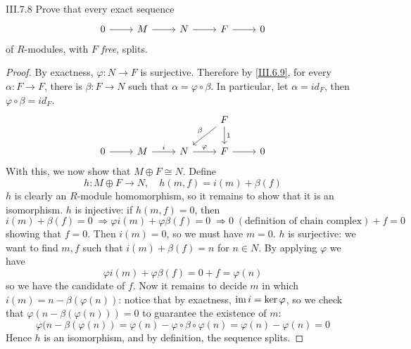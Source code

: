 \begin{problem}{III.7.8}
Prove that every exact sequence
\[
\begin{tikzcd}
0 \arrow[r] &M \arrow[r] &N \arrow[r] &F \arrow[r] &0
\end{tikzcd}
\]
of $R$-modules, with $F$ \emph{free}, splits.
\end{problem}
\begin{proof}
By exactness, $\varphi :N \longrightarrow F$ is surjective. Therefore by \ref{III.6.9}, for every $\alpha : F \to F$, there is $\beta : F \to N$ such that $\alpha = \varphi \circ \beta$. In particular, let $\alpha = id_F$, then $\varphi \circ \beta = id_F$.
\[
\begin{tikzcd}
&  &  & F \arrow[d, "1"] \arrow[ld, "\beta"'] &   \\
0 \arrow[r] & M \arrow[r, "i"] & N \arrow[r, "\varphi"] & F \arrow[r]                           & 0
\end{tikzcd}
\]
With this, we now show that $M \oplus F \cong N$. Define
\[
h: M \oplus F \to N, \quad	h(m,f) = i(m) + \beta(f)
\]
$h$ is clearly an $R$-module homomorphism, so it remains to show that it is an isomorphism. $h$ is injective: if $h(m,f) = 0$, then
\[
i(m) + \beta(f) = 0 \; \Rightarrow \varphi i(m) + \varphi \beta (f) = 0 \; \Rightarrow 0 \; (\text{definition of chain complex}) + f = 0
\]
showing that $f = 0$. Then $i(m) = 0$, so we must have $m = 0$. $h$ is surjective: we want to find $m,f$ such that $i(m) + \beta(f) = n$ for $n \in N$. By applying $\varphi$ we have
\[
\varphi i(m) + \varphi \beta (f) = 0 + f = \varphi(n)
\]
so we have the candidate of $f$. Now it remains to decide $m$ in which $i(m) = n - \beta(\varphi(n))$: notice that by exactness, $\operatorname{im} i = \ker \varphi$, so we check that $\varphi(n - \beta(\varphi(n))) = 0$ to guarantee the existence of $m$:
\[
\varphi(n - \beta(\varphi(n)) = \varphi(n) - \varphi \circ \beta \circ \varphi(n) = \varphi(n) - \varphi(n) = 0
\]
Hence $h$ is an isomorphism, and by definition, the sequence splits.
\end{proof}
